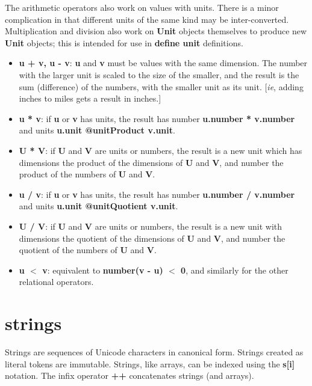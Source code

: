 \documentclass{report}
\begin{document}
The arithmetic operators also work on values with units. There is a minor
complication in that different units of the same kind may be inter-converted.
Multiplication and division also work on {\bf Unit} objects themselves to produce
new {\bf Unit} objects; this is intended for use in {\bf define unit} definitions.

\begin{itemize}\item {\bf u + v, u - v}: {\bf u} and {\bf v} must be values with the same dimension. The number
with the larger unit is scaled to the size of the smaller, and the result is
the sum (difference) of the numbers, with the smaller unit as its unit. {[}{\em ie},
adding inches to miles gets a result in inches.{]}

\item {\bf u * v}: if {\bf u} or {\bf v} has units, the result has number {\bf u.number *
v.number} and units {\bf u.unit @unitProduct v.unit}.

\item {\bf U * V}: if {\bf U} and {\bf V} are units or numbers, the result is a new unit which
has dimensions the product of the dimensions of {\bf U} and {\bf V}, and number the
product of the numbers of {\bf U} and {\bf V}.

\item {\bf u / v}: if {\bf u} or {\bf v} has units, the result has number {\bf u.number / v.number}
and units {\bf u.unit @unitQuotient v.unit}.

\item {\bf U / V}: if {\bf U} and {\bf V} are units or numbers, the result is a new unit with
dimensions the quotient of the dimensions of {\bf U} and {\bf V}, and number the
quotient of the numbers of {\bf U} and {\bf V}.

\item {\bf u $<$ v}: equivalent to {\bf number(v - u) $<$ 0}, and similarly for the other
relational operators.

\end{itemize}

\section{strings}


Strings are sequences of Unicode characters in canonical form. Strings created
as literal tokens are immutable. Strings, like arrays, can be indexed using
the {\bf s{[}i{]}} notation. The infix operator {\bf ++} concatenates strings (and
arrays).
\end{document}
